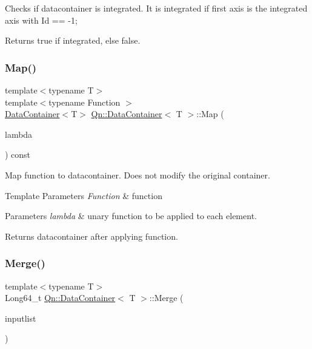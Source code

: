 Checks if datacontainer is integrated. It is integrated if first axis is the integrated axis with Id == -\/1; \begin{DoxyReturn}{Returns}
true if integrated, else false. 
\end{DoxyReturn}
\mbox{\label{classQn_1_1DataContainer_a270d35d401e506983516dbd00728232d}} 
\subsubsection{\texorpdfstring{Map()}{Map()}}
{\footnotesize\ttfamily template$<$typename T$>$ \\
template$<$typename Function $>$ \\
\mbox{\hyperlink{classQn_1_1DataContainer}{Data\+Container}}$<$T$>$ \mbox{\hyperlink{classQn_1_1DataContainer}{Qn\+::\+Data\+Container}}$<$ T $>$\+::Map (\begin{DoxyParamCaption}\item[{Function \&\&}]{lambda }\end{DoxyParamCaption}) const\hspace{0.3cm}{\ttfamily [inline]}}

Map function to datacontainer. Does not modify the original container. 
\begin{DoxyTemplParams}{Template Parameters}
{\em Function} & function \\
\hline
\end{DoxyTemplParams}

\begin{DoxyParams}{Parameters}
{\em lambda} & unary function to be applied to each element. \\
\hline
\end{DoxyParams}
\begin{DoxyReturn}{Returns}
datacontainer after applying function. 
\end{DoxyReturn}
\mbox{\label{classQn_1_1DataContainer_a7bc5a8330ed6a0a1964fc27af7fd6775}} 
\subsubsection{\texorpdfstring{Merge()}{Merge()}}
{\footnotesize\ttfamily template$<$typename T$>$ \\
Long64\+\_\+t \mbox{\hyperlink{classQn_1_1DataContainer}{Qn\+::\+Data\+Container}}$<$ T $>$\+::Merge (\begin{DoxyParamCaption}\item[{T\+Collection $\ast$}]{inputlist }\end{DoxyParamCaption})\hspace{0.3cm}{\ttfamily [inline]}}


